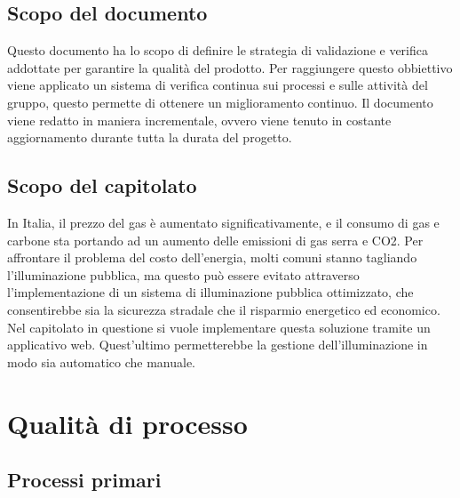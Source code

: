 \documentclass[12pt]{article}
\begin{document}
\subsection{Scopo del documento}
Questo documento ha lo scopo di definire le strategia di validazione e verifica addottate per garantire la qualità del prodotto.
Per raggiungere questo obbiettivo viene applicato un sistema di verifica continua sui processi e sulle attività del gruppo, questo permette di ottenere un miglioramento continuo.
Il documento viene redatto in maniera incrementale, ovvero viene tenuto in costante aggiornamento durante tutta la durata del progetto.
\subsection{Scopo del capitolato}
In Italia, il prezzo del gas è aumentato significativamente, e il consumo di gas e carbone sta portando ad un aumento delle emissioni di gas serra e CO2. Per affrontare il problema del costo dell'energia, molti comuni stanno tagliando l'illuminazione pubblica, ma questo può essere evitato attraverso l'implementazione di un sistema di illuminazione pubblica ottimizzato, che consentirebbe sia la sicurezza stradale che il risparmio energetico ed economico.
Nel capitolato in questione si vuole implementare questa soluzione tramite un applicativo web. Quest'ultimo permetterebbe la gestione dell'illuminazione in modo sia automatico che manuale.
\section{Qualità di processo}

\subsection{Processi primari}
\end{document}
